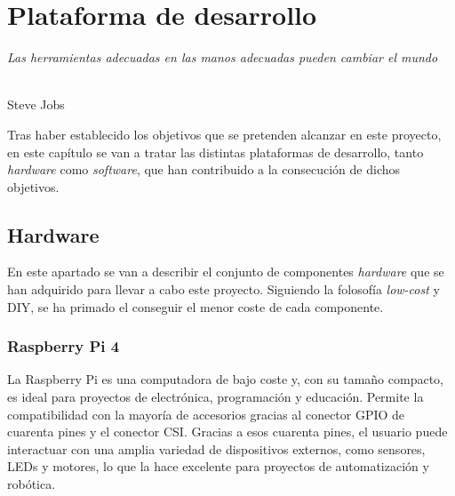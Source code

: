 \chapter{Plataforma de desarrollo}
\label{cap:capitulo4}

\begin{flushright}
\begin{minipage}[]{10cm}
\emph{Las herramientas adecuadas en las manos adecuadas pueden cambiar el mundo}\\
\end{minipage}\\

Steve Jobs\\
\end{flushright}

\vspace{1cm}

Tras haber establecido los objetivos que se pretenden alcanzar en este proyecto, en este capítulo se van a tratar las distintas plataformas de desarrollo, tanto \textit{hardware} como \textit{software}, que han contribuido a la consecución de dichos objetivos.

\section{Hardware}
\label{sec:hardware}

En este apartado se van a describir el conjunto de componentes \textit{hardware} que se han adquirido para llevar a cabo este proyecto. Siguiendo la folosofía \textit{low-cost} y \ac{DIY}, se ha primado el conseguir el menor coste de cada componente.

\subsection{Raspberry Pi 4}
\label{subsec:raspberry}

La Raspberry Pi es una computadora de bajo coste y, con su tamaño compacto, es ideal para proyectos de electrónica, programación y educación. Permite la compatibilidad con la mayoría de accesorios gracias al conector GPIO de cuarenta pines y el conector \ac{CSI}. Gracias a esos cuarenta pines, el usuario puede interactuar con una amplia variedad de dispositivos externos, como sensores, LEDs y motores, lo que la hace excelente para proyectos de automatización y robótica. 


